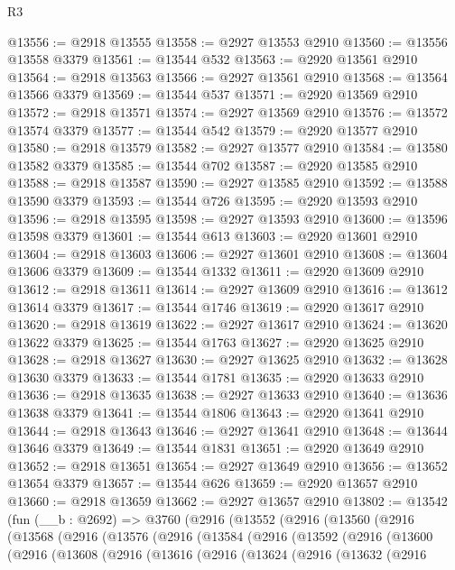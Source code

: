 \begin{lexlean}{R3}
\begin{coremodule}
@13556 := @2918 @13555
@13558 := @2927 @13553 @2910
@13560 := @13556 @13558 @3379
@13561 := @13544 @532
@13563 := @2920 @13561 @2910
@13564 := @2918 @13563
@13566 := @2927 @13561 @2910
@13568 := @13564 @13566 @3379
@13569 := @13544 @537
@13571 := @2920 @13569 @2910
@13572 := @2918 @13571
@13574 := @2927 @13569 @2910
@13576 := @13572 @13574 @3379
@13577 := @13544 @542
@13579 := @2920 @13577 @2910
@13580 := @2918 @13579
@13582 := @2927 @13577 @2910
@13584 := @13580 @13582 @3379
@13585 := @13544 @702
@13587 := @2920 @13585 @2910
@13588 := @2918 @13587
@13590 := @2927 @13585 @2910
@13592 := @13588 @13590 @3379
@13593 := @13544 @726
@13595 := @2920 @13593 @2910
@13596 := @2918 @13595
@13598 := @2927 @13593 @2910
@13600 := @13596 @13598 @3379
@13601 := @13544 @613
@13603 := @2920 @13601 @2910
@13604 := @2918 @13603
@13606 := @2927 @13601 @2910
@13608 := @13604 @13606 @3379
@13609 := @13544 @1332
@13611 := @2920 @13609 @2910
@13612 := @2918 @13611
@13614 := @2927 @13609 @2910
@13616 := @13612 @13614 @3379
@13617 := @13544 @1746
@13619 := @2920 @13617 @2910
@13620 := @2918 @13619
@13622 := @2927 @13617 @2910
@13624 := @13620 @13622 @3379
@13625 := @13544 @1763
@13627 := @2920 @13625 @2910
@13628 := @2918 @13627
@13630 := @2927 @13625 @2910
@13632 := @13628 @13630 @3379
@13633 := @13544 @1781
@13635 := @2920 @13633 @2910
@13636 := @2918 @13635
@13638 := @2927 @13633 @2910
@13640 := @13636 @13638 @3379
@13641 := @13544 @1806
@13643 := @2920 @13641 @2910
@13644 := @2918 @13643
@13646 := @2927 @13641 @2910
@13648 := @13644 @13646 @3379
@13649 := @13544 @1831
@13651 := @2920 @13649 @2910
@13652 := @2918 @13651
@13654 := @2927 @13649 @2910
@13656 := @13652 @13654 @3379
@13657 := @13544 @626
@13659 := @2920 @13657 @2910
@13660 := @2918 @13659
@13662 := @2927 @13657 @2910
@13802 := @13542
    (fun (__b : @2692) =>
    @3760
      (@2916
        (@13552
          (@2916
            (@13560
              (@2916
                (@13568
                  (@2916
                    (@13576
                      (@2916
                        (@13584
                          (@2916
                            (@13592
                              (@2916
                                (@13600
                                  (@2916
                                    (@13608
                                      (@2916
                                        (@13616
                                          (@2916
                                            (@13624
                                              (@2916
                                                (@13632
                                                  (@2916

\end{coremodule}
\end{lexlean}
